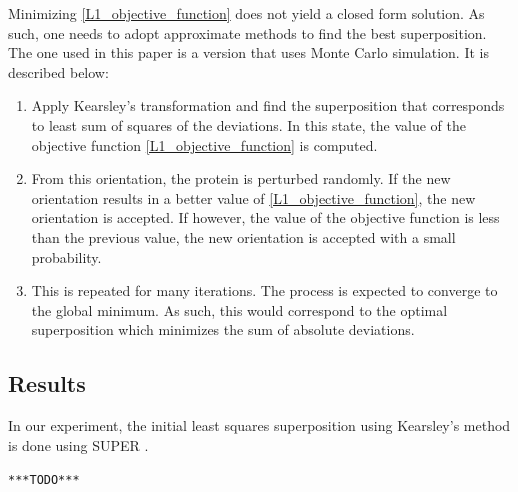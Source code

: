 \documentclass[wcp]{jmlr}
\begin{document}
Minimizing \eqref{L1_objective_function} does not yield a closed form solution. As such,
one needs to adopt approximate methods to find the best superposition. The one used in
this paper is a version that uses Monte Carlo simulation. It is described below:
\begin{enumerate}
\item Apply Kearsley's transformation and find the superposition that corresponds
to least sum of squares of the deviations. In this state, the value of the 
objective function \eqref{L1_objective_function} is computed. 
\item From this orientation, the protein is perturbed randomly. If the new orientation
results in a better value of \eqref{L1_objective_function}, the new orientation is
accepted. If however, the value of the objective function is less than the previous
value, the new orientation is accepted with a small probability.
\item This is repeated for many iterations. The process is expected to converge to
the global minimum. As such, this would correspond to the optimal
superposition which minimizes the sum of absolute deviations.
\end{enumerate}

\subsection*{Results}
In our experiment, the initial least squares superposition using Kearsley's method
is done using SUPER \citep{super}.

\texttt{***TODO***}




\appendix
\end{document}
